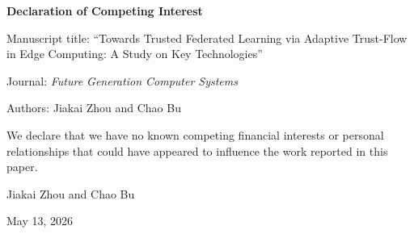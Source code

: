 \documentclass[10pt]{article}
\begin{document}
\begin{center}
    {\Large \textbf{Declaration of Competing Interest}}
\end{center}

\vspace{1em}

Manuscript title: ``Towards Trusted Federated Learning via Adaptive Trust-Flow in Edge Computing: A Study on Key Technologies''

Journal: \textit{Future Generation Computer Systems}

Authors: Jiakai Zhou and Chao Bu

\vspace{1em}

We declare that we have no known competing financial interests or personal relationships that could have appeared to influence the work reported in this paper.

\vspace{2em}

Jiakai Zhou and Chao Bu

\vspace{1em}

May 13, 2026
\end{document}
